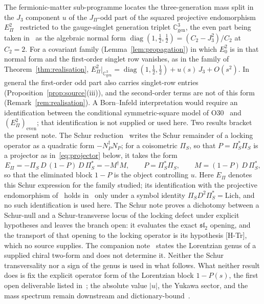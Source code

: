 \documentclass[11pt]{article}
\theoremstyle{definition}
\theoremstyle{remark}
\newcommand{\JPi}{J_{\Pi}}
\newcommand{\Jthree}{J_{3}}
\newcommand{\Cgen}{\mathbb{C}^{3}_{\mathrm{gen}}}
\newcommand{\Epi}{E_{\Pi}}
\newcommand{\PiS}{\Pi_{S}}
\newcommand{\diag}{\operatorname{diag}}
\begin{document}
    The fermionic-matter sub-programme locates the three-generation mass split in the $\Jthree$ component $u$ of the
    $\JPi$-odd part of the squared projective endomorphism $\Epi^2$~\cite{Beau2026q14} restricted to the gauge-singlet
    generation triplet $\Cgen$, the even part being taken in~\cite{Beau2026prs} as the algebraic normal form
    $\diag(1, \tfrac12, \tfrac12) = (C_2-J_3^2)/C_2$ at $C_2=2$.
    For a covariant family (Lemma~\ref{lem:propagation}) in which $E_0^2$ is in that normal form and the first-order
    singlet row vanishes, as in the family of
    Theorem~\ref{thm:realisation}, $\Epi^2|_{\Cgen} = \diag(1, \tfrac12, \tfrac12) + u(s)\,\Jthree + O(s^2)$.
    In general the first-order odd part also carries singlet-row entries (Proposition~\ref{prop:source}(iii)), and the
    second-order terms are not of this form (Remark~\ref{rem:realisation}).
    A Born--Infeld interpretation would require an identification between the conditional symmetric-square model
    of O30~\cite{Beau2026a34} and $(\Epi^2)_{\mathrm{even}}$; that identification is not supplied or used here.
    Two results bracket the present note.
    The Schur reduction~\cite{Beau2026prs} writes the Schur remainder of a locking operator as a quadratic form
    $-N_P^{\dagger}N_P$; for a coisometric $\PiS$, so that $P = \PiS^{*}\PiS$ is a projector as
    in~\eqref{eq:projector} below, it takes the form
    \begin{equation}
      \label{eq:schur}
      \Epi = -\PiS\,D\,(1-P)\,D\,\PiS^{*} = -M^{\dagger} M,
      \qquad P = \PiS^{*}\PiS,
      \qquad M = (1-P)\,D\,\PiS^{*},
    \end{equation}
    so that the eliminated block $1-P$ is the object controlling $u$.
    Here $\Epi$ denotes this Schur expression for the family studied; its identification with the projective
    endomorphism of~\cite{Beau2026q14} holds in~\cite{Beau2026prs} only under a symbol identity
    $\PiS D^2 \PiS^{*} = \mathrm{Lich}$, and no such identification is used here.
    The Schur note proves a dichotomy between a Schur-null and a Schur-transverse locus of the locking defect under
    explicit hypotheses and leaves the branch open: it evaluates the exact $\mathfrak{sl}_2$ opening, and the transport
    of that opening to the locking operator is its hypothesis [H-Tr], which no source supplies.
    The companion note~\cite{Beau2026bim} states the Lorentzian genus of a supplied chiral two-form and does not
    determine it.
    Neither the Schur transversality nor a sign of the genus is used in what follows.
    What neither result does is fix the explicit operator form of the Lorentzian block $1-P(s)$, the first open
    deliverable
    listed in~\cite{Beau2026prs}; the absolute value $|u|$, the Yukawa sector, and the mass spectrum remain downstream
    and
    dictionary-bound~\cite{Beau2026fmnote}.
\end{document}
